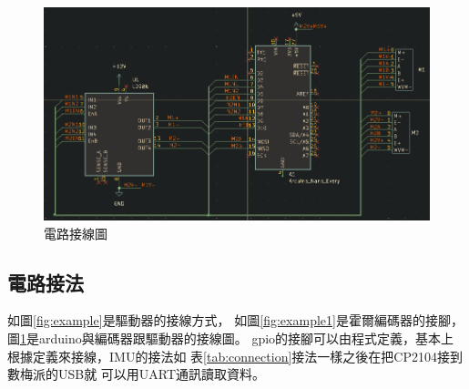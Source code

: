 \begin{figure}[htp]
\centering
\includegraphics[width=1\textwidth]{./img/arduino.png}
\caption{電路接線圖}
\label{fig:example2}
\end{figure}


\subsection{電路接法}
如圖\ref{fig:example}是驅動器的接線方式，
如圖\ref{fig:example1}是霍爾編碼器的接腳，
圖\ref{fig:example2}是arduino與編碼器跟驅動器的接線圖。
gpio的接腳可以由程式定義，基本上根據定義來接線，IMU的接法如
表\ref{tab:connection}接法一樣之後在把CP2104接到數梅派的USB就
可以用UART通訊讀取資料。
